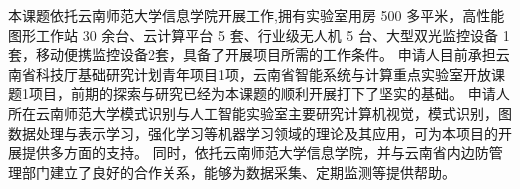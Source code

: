 本课题依托云南师范大学信息学院开展工作,拥有实验室用房 500 多平米，高性能图形工作站 30 余台、云计算平台 5 套、行业级无人机 5 台、大型双光监控设备 1 套，移动便携监控设备2套，具备了开展项目所需的工作条件。
申请人目前承担云南省科技厅基础研究计划青年项目1项，云南省智能系统与计算重点实验室开放课题1项目，前期的探索与研究已经为本课题的顺利开展打下了坚实的基础。
申请人所在云南师范大学模式识别与人工智能实验室主要研究计算机视觉，模式识别，图数据处理与表示学习，强化学习等机器学习领域的理论及其应用，可为本项目的开展提供多方面的支持。
同时，依托云南师范大学信息学院，并与云南省内边防管理部门建立了良好的合作关系，能够为数据采集、定期监测等提供帮助。